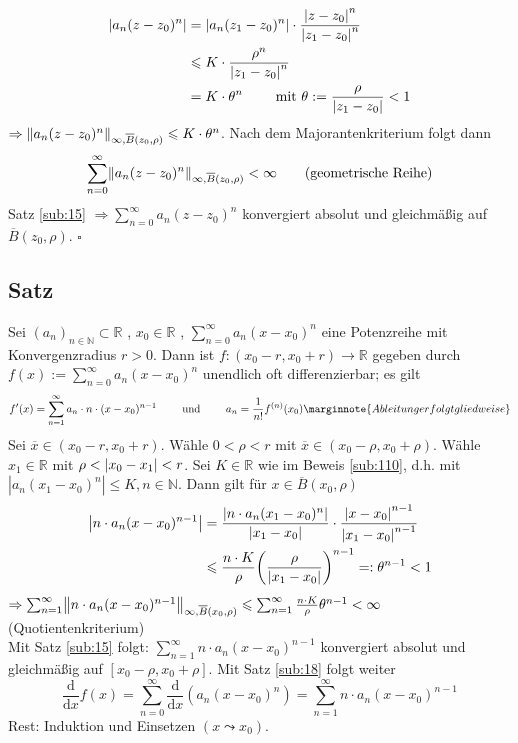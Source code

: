 \begin{align*}
	\abs*{a_n (z-z_0)^n} &= \abs*{a_n (z_1 -z_0)^n} \cdot \frac{\abs*{z-z_0}^n }{\abs*{z_1-z_0}^n }  \\
	&\le K \cdot \frac{\rho^n}{\abs*{z_1- z_0}^n } \\
	&= K \cdot \theta^n \qquad \text{ mit } \theta := \frac{\rho}{\abs*{z_1 -z_0} } < 1 
\end{align*}
$\Rightarrow \norm[\infty, \overline{B}(z_0, \rho) ]{a_n (z-z_0)^n}  \le K \cdot \theta^n$. Nach dem Majorantenkriterium folgt dann
\[
	\sum_{n=0}^{\infty} \norm[\infty, \overline{B} (z_0, \rho)]{a_n (z-z_0)^n} < \infty \tag{geometrische Reihe}
\]
Satz \ref{sub:15} $\Rightarrow \sum_{n=0}^{\infty} a_n (z-z_0)^n$ konvergiert absolut und gleichmäßig auf $\overline{B}(z_0, \rho) $. \hfill \( \square \)

\subsection[Satz über Differenzierbarkeit innerhalb des Konvergenzradius]{Satz} %
\label{sub:111}
Sei $(a_n)_{n \in \mathds{N}} \subset \mathds{R}$ , $x_0 \in \mathds{R}$ , $\sum_{n=0}^{\infty} a_n (x-x_0)^n$ eine Potenzreihe mit Konvergenzradius $r>0$.
Dann ist $f : (x_0 -r , x_0 +r) \to \mathds{R}$ gegeben durch $f(x) := \sum_{n=0}^{\infty} a_n (x-x_0)^n$ unendlich oft differenzierbar; es gilt
\[
	f'(x) = \sum_{n=1}^{\infty} a_n \cdot n \cdot (x-x_0)^{n-1} \qquad \text{ und } \qquad a_n = \frac{1}{n!} f^{(n)}(x_0)
	\marginnote{Ableitung erfolgt gliedweise}
\]
Sei $\overline{x}\in (x_0 -r, x_0 +r) $. Wähle $0<\rho < r$ mit $\overline{x} \in ( x_0 - \rho, x_0 + \rho)$. Wähle $x_1\in \mathds{R}$ mit $\rho < \abs*{x_0 - x_1} <r $.
Sei $K \in \mathds{R}$ wie im Beweis \ref{sub:110}, d.h. mit $| a_n(x_1 -x_0)^n | \le K , n \in \mathds{N} $. Dann gilt für $x \in \overline{B}(x_0, \rho) $
\begin{align*}
	\abs*{n \cdot a_n (x-x_0)^{n-1}} &= \frac{\abs*{n \cdot  a_n (x_1-x_0)^n}}{\abs*{x_1-x_0} } \cdot \frac{\abs*{x-x_0}^{n-1} }{\abs*{x_1-x_0}^{n-1} } \\  
	&\le \frac{n \cdot K}{\rho} \enbrace*{\frac{\rho}{\abs*{x_1-x_0} } }^{n-1} =: \theta^{n-1} <1  
\end{align*}
$\Rightarrow \sum_{n=1}^{\infty} \norm[\infty, \overline{B} (x_0, \rho)]{n \cdot a_n (x-x_0)^{n-1}}\le \sum_{n=1}^{\infty} \frac{n \cdot K}{\rho} \theta^{n-1} <\infty $
 (Quotientenkriterium)\\
Mit Satz \ref{sub:15} folgt: $\sum_{n=1}^{\infty} n \cdot a_n (x-x_0)^{n-1} $ konvergiert absolut und gleichmäßig auf $[x_0- \rho, x_0+\rho]$. Mit Satz \ref{sub:18} folgt 
weiter
\[
	\frac{\mathrm{d}}{ \mathrm{d}x } f(x) = \sum_{n=0}^{\infty}  \frac{\mathrm{d}}{ \mathrm{d}x } (a_n (x-x_0)^n) = \sum_{n=1}^{\infty} n \cdot a_n (x-x_0)^{n-1}
\]
Rest: Induktion und Einsetzen $(x \leadsto x_0)$. \bewende

